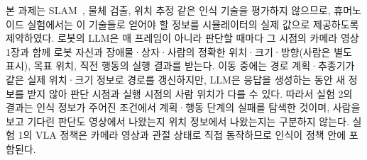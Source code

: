 본 과제는 SLAM~\cite{slam}, 물체 검출, 위치 추정 같은 인식 기술을 평가하지 않으므로, 휴머노이드 실험에서는 이 기술들로 얻어야 할 정보를 시뮬레이터의 실제 값으로 제공하도록 제약하였다. 
로봇의 LLM은 매 프레임이 아니라 판단할 때마다 그 시점의 카메라 영상 1장과 함께 로봇 자신과 장애물·상자·사람의 정확한 위치·크기·방향(사람은 별도 표시), 목표 위치, 직전 행동의 실행 결과를 받는다. 
이동 중에는 경로 계획·추종기가 같은 실제 위치·크기 정보로 경로를 갱신하지만, LLM은 응답을 생성하는 동안 새 정보를 받지 않아 판단 시점과 실행 시점의 사람 위치가 다를 수 있다.
따라서 실험 2의 결과는 인식 정보가 주어진 조건에서 계획·행동 단계의 실패를 탐색한 것이며, 사람을 보고 기다린 판단도 영상에서 나왔는지 위치 정보에서 나왔는지는 구분하지 않는다. 
실험 1의 VLA 정책은 카메라 영상과 관절 상태로 직접 동작하므로 인식이 정책 안에 포함된다.
